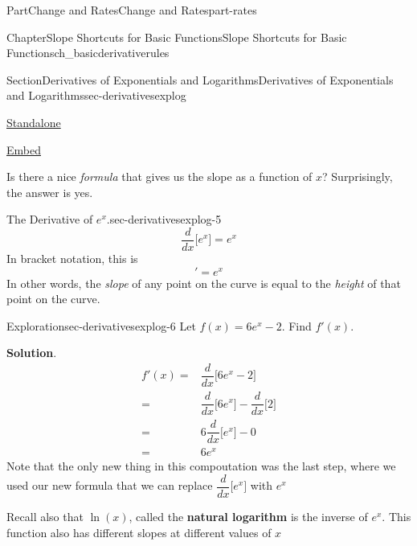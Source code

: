 \documentclass{tufte-book}
\newcommand{\blocktitlefont}{\relax}
\newcommand{\terminology}[1]{\textbf{#1}}
\numberwithin{equation}{chapter}
\newcommand{\ddx}[1]{ \dfrac{d}{dx} \Big[ #1 \Big]  }
\newcommand{\amp}{&}
\begin{document}
\begin{partptx}{Part}{Change and Rates}{}{Change and Rates}{}{}{part-rates}
\begin{chapterptx}{Chapter}{Slope Shortcuts for Basic Functions}{}{Slope Shortcuts for Basic Functions}{}{}{ch_basicderivativerules}
\begin{sectionptx}{Section}{Derivatives of Exponentials and Logarithms}{}{Derivatives of Exponentials and Logarithms}{}{}{sec-derivativesexplog}
\begin{sidebyside}{2}{0.075}{0.075}{0.17}
\begin{sbspanel}{0.21}
\href{http://webwork.bridgew.edu/oer/functions_at_work/sec-derivativesexplog-4-3.html}{Standalone}%
\par
\href{http://webwork.bridgew.edu/oer/functions_at_work/sec-derivativesexplog-4-3-if.html}{Embed}%
\end{sbspanel}%
\end{sidebyside}%
 Is there a nice \emph{formula} that gives us the slope as a function of \(x\)?  Surprisingly, the answer is yes.%
\begin{paragraphs}{The Derivative of \(e^x\).}{sec-derivativesexplog-5}%
%
\begin{equation*}
\ddx{e^x} = e^x
\end{equation*}
In bracket notation, this is%
\begin{equation*}
[e^x ]' = e^x
\end{equation*}
In other words, the \emph{slope} of any point on the curve is equal to the \emph{height} of that point on the curve.\end{paragraphs}%
\begin{exploration}{Exploration}{}{sec-derivativesexplog-6}%
Let \(f(x) = 6e^x - 2\). Find \(f'(x)\).%
\par\smallskip%
\noindent\textbf{\blocktitlefont Solution}.\hypertarget{sec-derivativesexplog-6-2}{}\quad{}%
\begin{align*}
f'(x) = \amp \ddx{ 6e^x - 2 }\\
= \amp \ddx{6e^x} - \ddx{2} \\
= \amp 6\ddx{e^x} - 0\\
= \amp 6 e^x 
\end{align*}
Note that the only new thing in this compoutation was the last step, where we used our new formula that we can replace \(\ddx{e^x}\) with \(e^x\)%
\end{exploration}%
Recall also that \(\ln(x)\), called the \terminology{natural logarithm} is the inverse of \(e^x\).  This function also has different slopes at different values of \(x\) \begin{sidebyside}{2}{0.075}{0.075}{0.17}%
\begin{sbspanel}{0.47}%

\end{sbspanel}
\end{sidebyside}
\end{sectionptx}
\end{chapterptx}
\end{partptx}
\end{document}

